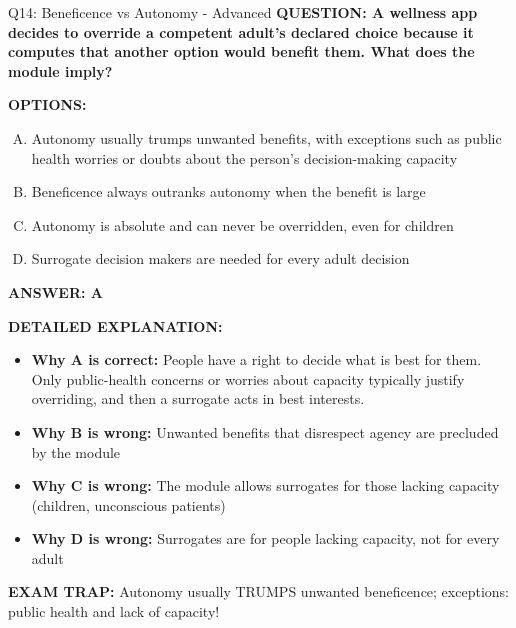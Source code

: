 \documentclass[8pt]{beamer}
\begin{document}
\begin{frame}[shrink=6]{Q14: Beneficence vs Autonomy - Advanced}
\fontsize{6.5}{7.5}\selectfont
\textbf{QUESTION: A wellness app decides to override a competent adult's declared choice because it computes that another option would benefit them. What does the module imply?}

\vspace{0.1cm}
\textbf{OPTIONS:}
\begin{enumerate}[A.]
\item Autonomy usually trumps unwanted benefits, with exceptions such as public health worries or doubts about the person's decision-making capacity
\item Beneficence always outranks autonomy when the benefit is large
\item Autonomy is absolute and can never be overridden, even for children
\item Surrogate decision makers are needed for every adult decision
\end{enumerate}

\vspace{0.1cm}
\textcolor{myblue}{\textbf{ANSWER: A}}

\vspace{0.1cm}
\textbf{DETAILED EXPLANATION:}
\begin{itemize}
\item \textbf{Why A is correct:} People have a right to decide what is best for them. Only public-health concerns or worries about capacity typically justify overriding, and then a surrogate acts in best interests.
\item \textbf{Why B is wrong:} Unwanted benefits that disrespect agency are precluded by the module
\item \textbf{Why C is wrong:} The module allows surrogates for those lacking capacity (children, unconscious patients)
\item \textbf{Why D is wrong:} Surrogates are for people lacking capacity, not for every adult
\end{itemize}

\textcolor{myred}{\textbf{EXAM TRAP:}} Autonomy usually TRUMPS unwanted beneficence; exceptions: public health and lack of capacity!
\end{frame}
\end{document}
